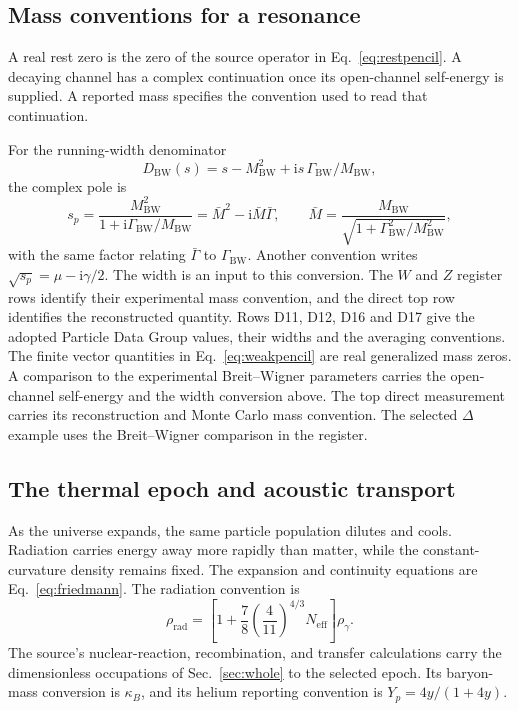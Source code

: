 \documentclass[aps,prx,onecolumn,10pt,notitlepage,nofootinbib,longbibliography]{revtex4-2}
\numberwithin{equation}{section}
\numberwithin{table}{section}
\newcommand{\ii}{\mathrm i}
\begin{document}
\subsection{Mass conventions for a resonance}
A real rest zero is the zero of the source operator in Eq.~\eqref{eq:restpencil}. A decaying channel has a complex continuation once its open-channel self-energy is supplied. A reported mass specifies the convention used to read that continuation.

For the running-width denominator
\begin{equation}
 D_{\mathrm{BW}}(s)=s-M_{\mathrm{BW}}^2
 +\ii s\,\Gamma_{\mathrm{BW}}/M_{\mathrm{BW}},
\end{equation}
the complex pole is
\begin{equation}
 s_p=\frac{M_{\mathrm{BW}}^2}{1+\ii\Gamma_{\mathrm{BW}}/M_{\mathrm{BW}}}
 =\bar M^2-\ii\bar M\bar\Gamma,\qquad
 \bar M=\frac{M_{\mathrm{BW}}}{\sqrt{1+\Gamma_{\mathrm{BW}}^2/M_{\mathrm{BW}}^2}},
\end{equation}
with the same factor relating $\bar\Gamma$ to $\Gamma_{\mathrm{BW}}$. Another convention writes $\sqrt{s_p}=\mu-\ii\gamma/2$. The width is an input to this conversion. The $W$ and $Z$ register rows identify their experimental mass convention, and the direct top row identifies the reconstructed quantity. Rows D11, D12, D16 and D17 give the adopted Particle Data Group values, their widths and the averaging conventions.\cite{PDG2026} The finite vector quantities in Eq.~\eqref{eq:weakpencil} are real generalized mass zeros. A comparison to the experimental Breit--Wigner parameters carries the open-channel self-energy and the width conversion above. The top direct measurement carries its reconstruction and Monte Carlo mass convention. The selected $\Delta$ example uses the Breit--Wigner comparison in the register.

\subsection{The thermal epoch and acoustic transport}
As the universe expands, the same particle population dilutes and cools. Radiation carries energy away more rapidly than matter, while the constant-curvature density remains fixed. The expansion and continuity equations are Eq.~\eqref{eq:friedmann}.
The radiation convention is
\begin{equation}
 \rho_{\mathrm{rad}}=
 \left[1+\frac78\left(\frac4{11}\right)^{4/3}N_{\mathrm{eff}}\right]\rho_\gamma.
\end{equation}
The source's nuclear-reaction, recombination, and transfer calculations carry the dimensionless occupations of Sec.~\ref{sec:whole} to the selected epoch. Its baryon-mass conversion is $\kappa_B$, and its helium reporting convention is $Y_p=4y/(1+4y)$.
\end{document}
